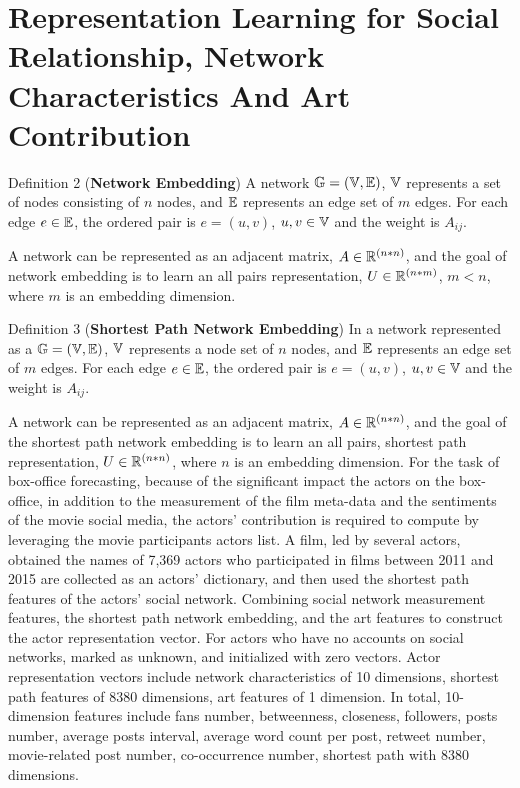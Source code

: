 \documentclass[review]{cvpr}
\begin{document}
\section{Representation Learning for Social Relationship, Network Characteristics And Art Contribution}

\par \noindent Definition 2 (\textbf{Network Embedding})  A network $\Bbb G=(\Bbb V,\Bbb E)$, $\Bbb V$ represents a set of nodes consisting of $n$ nodes, and $\Bbb E$ represents an edge set of $m$ edges.
For each edge $e\in \Bbb E$, the ordered pair is $e=(u,v)$, $u,v \in \Bbb V$ and the weight is $A_{ij}$.

A network can be represented as an adjacent matrix, $A\in \Bbb R^{(n*n)}$, and the goal of network embedding is to learn an all pairs representation, $U\in \Bbb R^{(n*m)}$, $m < n$, where $m$ is an embedding dimension.\par
\par \noindent Definition 3 (\textbf{Shortest Path Network Embedding})  In a network represented as a $\Bbb G=(\Bbb V,\Bbb E)$, $\Bbb V$ represents a node set of $n$ nodes, and $\Bbb E$ represents an edge set of $m$ edges.
For each edge $e\in \Bbb E$, the ordered pair is $e=(u,v)$, $u,v \in \Bbb V$ and the weight is $A_{ij}$.

\par A network can be represented as an adjacent matrix, $A\in \Bbb R^{(n*n)}$, and the goal of the shortest path network embedding is to learn an all pairs, shortest path representation, $U\in \Bbb R^{(n*n)}$, where $n$ is an embedding dimension.
For the task of box-office forecasting, because of the significant impact the actors on the box-office, in addition to the measurement of the film meta-data and the sentiments of the movie social media, the actors' contribution is required to compute by leveraging the movie participants actors list.
A film, led by several actors, obtained the names of 7,369 actors who participated in films between 2011 and 2015 are collected as an actors' dictionary, and then used the shortest path features of the actors' social network.
Combining social network measurement features, the shortest path network embedding, and the art features to construct the actor representation vector.
For actors who have no accounts on social networks, marked as unknown, and initialized with zero vectors.
Actor representation vectors include network characteristics of 10 dimensions, shortest path features of 8380 dimensions, art features of 1 dimension.
In total, 10-dimension features include fans number, betweenness, closeness, followers, posts number, average posts interval, average word count per post, retweet number, movie-related post number, co-occurrence number, shortest path with 8380 dimensions.
\end{document}
